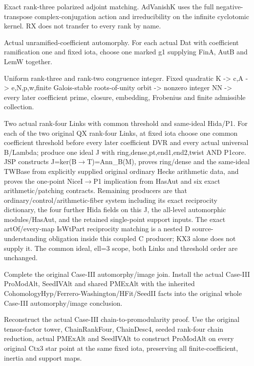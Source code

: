 \begin{description}[style=nextline]
\item[10. AD\_VANISH\_K\_MATCH --- D] Exact rank-three polarized adjoint matching. AdVanishK uses the full negative-transpose complex-conjugation action and irreducibility on the infinite cyclotomic kernel. RX does not transfer to every rank by name.

\item[11. AUT\_UNRAM\_COEF --- C] Actual unramified-coefficient automorphy. For each actual Dat with coefficient ramification one and fixed iota, choose one marked g1 supplying FinA, AutB and LemW together.

\item[12. CNR3 --- C] Uniform rank-three and rank-two congruence integer. Fixed quadratic K -> c,A -> e,N,p,w,finite Galois-stable roots-of-unity orbit -> nonzero integer NN -> every later coefficient prime, closure, embedding, Frobenius and finite admissible collection.

\item[13. COUNT\_II\_SUPPORT --- C] Two actual rank-four Links with common threshold and same-ideal Hida/P1. For each of the two original QX rank-four Links, at fixed iota choose one common coefficient threshold before every later coefficient DVR and every actual universal B/Lambda; produce one ideal J with ring,dense,pt,end1,end2,twist AND P1core. JSP constructs J=ker(B$\to$T)=Ann\_B(M), proves ring/dense and the same-ideal TWBase from explicitly supplied original ordinary Hecke arithmetic data, and proves the one-point NiceI$\to$P1 implication from HasAut and six exact arithmetic/patching contracts. Remaining producers are that ordinary/control/arithmetic-fiber system including its exact reciprocity dictionary, the four further Hida fields on this J, the all-level automorphic modules/HasAut, and the retained single-point support inputs. The exact artOf/every-map IsWtPart reciprocity matching is a nested D source-understanding obligation inside this coupled C producer; KX3 alone does not supply it. The common ideal, ell=3 scope, both Links and threshold order are unchanged.

\item[14. TASK\_CASE3\_AUT\_JOIN --- B] Complete the original Case-III automorphy/image join. Install the actual Case-III ProModAlt, SeedIVAlt and shared PMExAlt with the inherited CohomologyHyp/Ferrero-Washington/HFit/SeedII facts into the original whole Case-III automorphy/image conclusion.

\item[15. TASK\_CASE3\_PROMOD\_JOIN --- C] Reconstruct the actual Case-III chain-to-promodularity proof. Use the original tensor-factor tower, ChainRankFour, ChainDesc4, seeded rank-four chain reduction, actual PMExAlt and SeedIVAlt to construct ProModAlt on every original Ctx3 star point at the same fixed iota, preserving all finite-coefficient, inertia and support maps.


\end{description}
